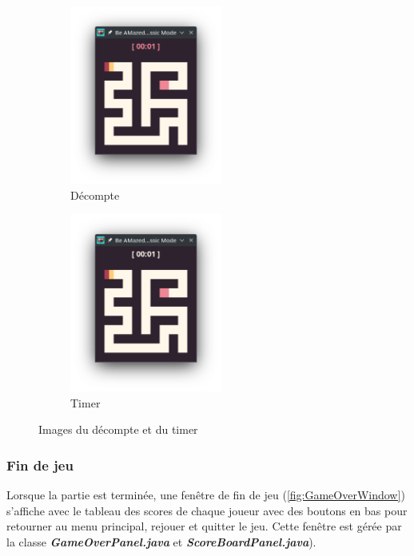 \begin{figure}[!htb]%
    \centering
    \begin{subfigure}{5cm}
        \includegraphics[width=5cm]{ressources/Implementation/Labyrinthe/Vue/CountdownTimer/CountDown.png}%
        \caption{Décompte}
        \label{fig:Countdown}
    \end{subfigure}
    \qquad
    \begin{subfigure}{5cm}
        \includegraphics[width=5cm]{ressources/Implementation/Labyrinthe/Vue/CountdownTimer/Timer.png}%
        \caption{Timer}
        \label{fig:Timer}
    \end{subfigure}
    \caption{Images du décompte et du timer}%
    \label{fig:CountdownAndTimer}
\end{figure}
\FloatBarrier

\subsubsection*{Fin de jeu}

Lorsque la partie est terminée, une fenêtre de fin de jeu (\ref{fig:GameOverWindow}) s'affiche avec le tableau des scores de chaque joueur avec des boutons en bas pour retourner au menu principal, rejouer et quitter le jeu. Cette fenêtre est gérée par la classe \textbf{\textit{GameOverPanel.java}} et \textbf{\textit{ScoreBoardPanel.java}}).

